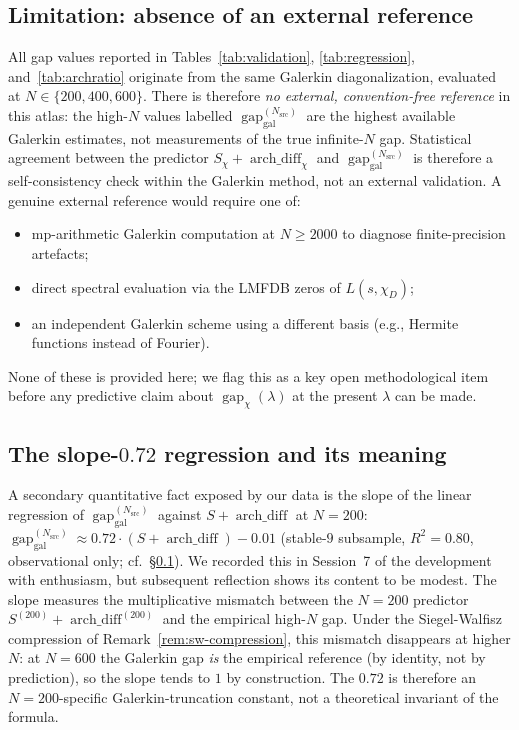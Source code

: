 \documentclass[a4paper,10pt,twocolumn]{article}
\theoremstyle{definition}
\theoremstyle{remark}
\newcommand{\gap}{\operatorname{gap}}
\newcommand{\chifn}{\chi}
\newcommand{\archdiff}{\operatorname{arch\_diff}}
\begin{document}
\subsection{Limitation: absence of an external reference}
\label{sec:limitation-external}

All gap values reported in Tables~\ref{tab:validation},
\ref{tab:regression}, and~\ref{tab:archratio} originate from the
same Galerkin diagonalization, evaluated at $N\in\{200,400,600\}$.
There is therefore \emph{no external, convention-free reference} in
this atlas: the high-$N$ values labelled
$\gap_{\mathrm{gal}}^{(N_{\mathrm{src}})}$ are the highest available
Galerkin estimates, not measurements of the true infinite-$N$ gap.
Statistical agreement between the predictor $S_\chi+\archdiff_\chi$
and $\gap_{\mathrm{gal}}^{(N_{\mathrm{src}})}$ is therefore a
self-consistency check within the Galerkin method, not an external
validation. A genuine external reference would require one of:
\begin{itemize}
\item[(i)] mp-arithmetic Galerkin computation at $N\geq 2000$ to
  diagnose finite-precision artefacts;
\item[(ii)] direct spectral evaluation via the LMFDB zeros of
  $L(s,\chifn_D)$;
\item[(iii)] an independent Galerkin scheme using a different basis
  (e.g., Hermite functions instead of Fourier).
\end{itemize}
None of these is provided here; we flag this as a key open
methodological item before any predictive claim about
$\gap_{\chifn}(\lambda)$ at the present $\lambda$ can be made.

\subsection{\texorpdfstring{The slope-$0.72$ regression and its meaning}{The slope-0.72 regression and its meaning}}
\label{sec:discussion-slope}

A secondary quantitative fact exposed by our data is the slope of
the linear regression of $\gap_{\mathrm{gal}}^{(N_{\mathrm{src}})}$
against $S+\archdiff$ at $N=200$:
$\gap_{\mathrm{gal}}^{(N_{\mathrm{src}})}\approx 0.72\cdot
(S+\archdiff)-0.01$
(stable-$9$ subsample, $R^2=0.80$, observational only; cf.\
\S\ref{sec:limitation-external}). We recorded this in Session~7 of
the development with enthusiasm, but subsequent reflection shows
its content to be modest. The slope measures the multiplicative
mismatch between the $N=200$ predictor $S^{(200)}+\archdiff^{(200)}$
and the empirical high-$N$ gap. Under the Siegel-Walfisz
compression of Remark~\ref{rem:sw-compression}, this mismatch
disappears at higher $N$: at $N=600$ the Galerkin gap \emph{is}
the empirical reference (by identity, not by prediction), so the
slope tends to $1$ by construction. The $0.72$ is therefore an
$N=200$-specific Galerkin-truncation constant, not a theoretical
invariant of the formula.
\end{document}
